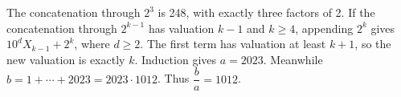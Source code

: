 The concatenation through $2^3$ is 248, with exactly three factors of 2. If the concatenation through $2^{k-1}$ has valuation $k-1$ and $k\ge4$, appending $2^k$ gives $10^dX_{k-1}+2^k$, where $d\ge2$. The first term has valuation at least $k+1$, so the new valuation is exactly $k$. Induction gives $a=2023$. Meanwhile $b=1+\cdots+2023=2023\cdot1012$. Thus $\boxed{\dfrac{b}{a}=1012}$.
